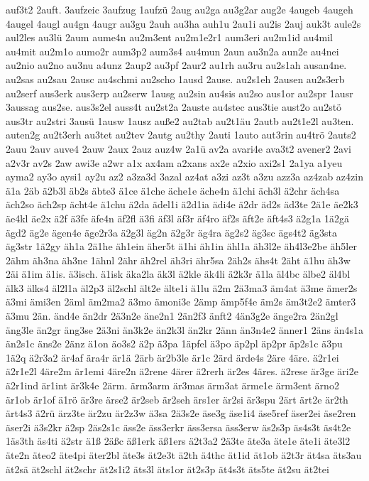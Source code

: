 {auf3t2
2auft.
3aufzeic
3aufzug
1aufzü
2aug
au2ga
au3g2ar
aug2e
4augeb
4augeh
4augel
4augl
au4gn
4augr
au3gu
2auh
au3ha
auh1u
2au1i
au2is
2auj
auk3t
aule2s
aul2les
au3lü
2aum
aume4n
au2m3ent
au2m1e2r1
aum3eri
au2m1id
au4mil
au4mit
au2m1o
aumo2r
aum3p2
aum3s4
au4mun
2aun
au3n2a
aun2e
au4nei
au2nio
au2no
au3nu
a4unz
2aup2
au3pf
2aur2
au1rh
au3ru
au2s1ah
ausan4ne.
au2sas
au2sau
2ausc
au4schmi
au2scho
1ausd
2ause.
au2s1eh
2ausen
au2s3erb
au2serf
aus3erk
aus3erp
au2serw
1ausg
au2sin
au4sis
au2so
aus1or
au2spr
1ausr
3aussag
aus2se.
aus3s2el
auss4t
au2st2a
2auste
au4stec
aus3tie
aust2o
au2stö
aus3tr
au2stri
3ausü
1ausw
1ausz
auße2
au2tab
au2t1äu
2autb
au2t1e2l
au3ten.
auten2g
au2t3erh
au3tet
au2tev
2autg
au2thy
2auti
1auto
aut3rin
au4trö
2auts2
2auu
2auv
auve4
2auw
2aux
2auz
auz4w
2a1ü
av2a
avari4e
ava3t2
avener2
2avi
a2v3r
av2s
2aw
awi3e
a2wr
a1x
ax4am
a2xans
ax2e
a2xio
axi2s1
2a1ya
a1yeu
ayma2
ay3o
aysi1
ay2u
az2
a3za3d
3azal
az4at
a3zi
az3t
a3zu
azz3a
az4zab
az4zin
ä1a
2äb
ä2b3l
äb2s
äbte3
ä1ce
ä1che
äche1e
äche4n
ä1chi
äch3l
ä2chr
äch4sa
äch2so
äch2sp
ächt4e
ä1chu
ä2da
ädel1i
ä2d1ia
ädi4e
ä2dr
äd2s
äd3te
2ä1e
äe2k3
äe4kl
äe2x
ä2f
ä3fe
äfe4n
äf2fl
ä3fi
äf3l
äf3r
äf4ro
äf2s
äft2e
äft4s3
ä2g1a
1ä2gä
ägd2
äg2e
ägen4e
äge2r3a
ä2g3l
äg2n
ä2g3r
äg4ra
äg2s2
äg3sc
ägs4t2
äg3sta
äg3str
1ä2gy
äh1a
2ä1he
äh1ein
äher5t
ä1hi
äh1in
ähl1a
äh3l2e
äh4l3e2be
äh5ler
2ähm
äh3na
äh3ne
1ähnl
2ähr
äh2rel
äh3ri
ähr5sa
2äh2s
ähs4t
2äht
ä1hu
äh3w
2äi
ä1im
ä1is.
ä3isch.
ä1isk
äka2la
äk3l
ä2kle
äk4li
ä2k3r
ä1la
äl4bc
älbe2
äl4bl
älk3
älks4
äl2l1a
äl2p3
äl2schl
ält2e
älte1i
ä1lu
ä2m
2ä3ma3
äm4at
ä3me
ämer2s
ä3mi
ämi3en
2äml
äm2ma2
ä3mo
ämoni3e
2ämp
ämp5f4e
äm2s
äm3t2e2
ämter3
ä3mu
2än.
änd4e
än2dr
2ä3n2e
äne2n1
2än2f3
änft2
4än3g2e
änge2ra
2än2gl
äng3le
än2gr
äng3se
2ä3ni
än3k2e
än2k3l
än2kr
2änn
än3n4e2
änner1
2äns
än4s1a
än2s1c
äns2e
2änz
ä1on
äo3s2
ä2p
ä3pa
1äpfel
ä3po
äp2pl
äp2pr
äp2s1c
ä3pu
1ä2q
ä2r3a2
är4af
ära4r
är1ä
2ärb
är2b3le
är1c
2ärd
ärde4s
2äre
4äre.
ä2r1ei
ä2r1e2l
4äre2m
är1emi
4äre2n
ä2rene
4ärer
ä2rerh
är2es
4äres.
ä2rese
är3ge
äri2e
ä2r1ind
är1int
är3k4e
2ärm.
ärm3arm
är3mas
ärm3at
ärme1e
ärm3ent
ärno2
är1ob
är1of
ä1rö
är3re
ärse2
är2seb
är2seh
ärs1er
är2si
är3spu
2ärt
ärt2e
är2th
ärt4s3
ä2rü
ärz3te
är2zu
är2z3w
ä3sa
2ä3s2e
äse3g
äse1i4
äse5ref
äser2ei
äse2ren
äser2i
ä3s2kr
ä2sp
2äs2s1c
äss2e
äss3erkr
äss3ersa
äss3erw
äs2s3p
äs4s3t
äs4t2e
1äs3th
äs4ti
ä2str
ä1ß
2äßc
äß1erk
äß1ers
ä2t3a2
2ä3te
äte3a
äte1e
äte1i
äte3l2
äte2n
äteo2
äte4pi
äter2bl
äte3s
ät2e3t
ä2th
ä4thc
ät1id
ät1ob
ä2t3r
ät4sa
äts3au
ät2sä
ät2schl
ät2schr
ät2s1i2
äts3l
äts1or
ät2s3p
ät4s3t
äts5te
ät2su
ät2tei
}
